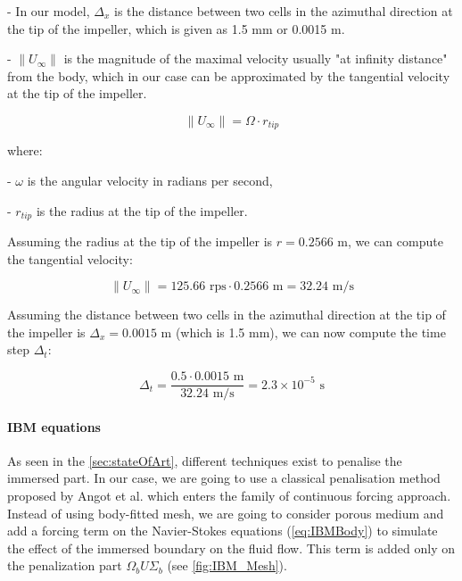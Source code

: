 - In our model, $\Delta_{x}$ is the distance between two cells in the azimuthal direction at the tip of the impeller, which is given as 1.5 mm or 0.0015 m.

- $\|U_{\infty}\|$ is the magnitude of the maximal velocity usually "at infinity distance" from the body, which in our case can be approximated by the tangential velocity at the tip of the impeller.

\begin{equation}
    \|U_{\infty}\| = \Omega \cdot r_{tip}
\end{equation}

where:

- $\omega$ is the angular velocity in radians per second,

- $r_{tip}$ is the radius at the tip of the impeller.

Assuming the radius at the tip of the impeller is $r = 0.2566 \text{ m}$, we can compute the tangential velocity:

\begin{equation}
    \|U_{\infty}\| = 125.66 \text{ rps} \cdot 0.2566 \text{ m} =  \text{32.24 m/s}
\end{equation}

Assuming the distance between two cells in the azimuthal direction at the tip of the impeller is $\Delta_{x} = 0.0015 \text{ m}$ (which is 1.5 mm), we can now compute the time step $\Delta_{t}$:

\begin{equation}
    \Delta_{t} = \frac{0.5 \cdot 0.0015 \text{ m}}{32.24 \text{ m/s}} = 2.3 \times 10^{-5} \text{ s} %
\end{equation}












\paragraph{IBM equations}

As seen in the \autoref{sec:stateOfArt}, different techniques exist to penalise the immersed part. In our case, we are going to use a classical penalisation method proposed by Angot et al.\cite{angotPenalizationMethodTake1999a} which enters the family of continuous forcing approach. Instead of using body-fitted mesh, we are going to consider porous medium and add a forcing term on the Navier-Stokes equations (\autoref{eq:IBMBody}) to simulate the effect of the immersed boundary on the fluid flow. This term is added only on the penalization part $\Omega_b U \Sigma_b$ (see \autoref{fig:IBM_Mesh}).

